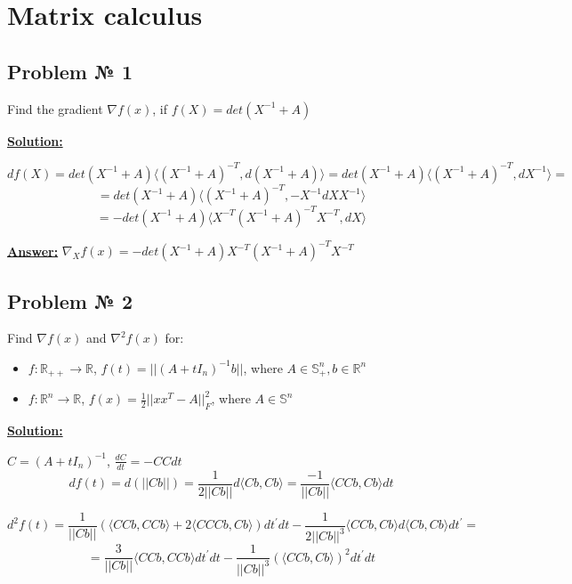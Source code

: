 \section{Matrix calculus}

\subsection{Problem № 1} Find the gradient $\nabla f(x)$, if $f(X) = det \left( X^{-1} + A \right)$

\underline{\textbf{Solution:}}

\begin{equation*}
    df(X) = det \left(X^{-1} + A \right) \langle (X^{-1} + A)^{-T}, d(X^{-1} + A) \rangle = det \left(X^{-1} + A \right) \langle (X^{-1} + A)^{-T}, dX^{-1} \rangle =
\end{equation*}
\begin{equation*}
    = det \left(X^{-1} + A \right) \langle (X^{-1} + A)^{-T}, -X^{-1}dX X^{-1} \rangle 
\end{equation*}
\begin{equation*}
    = -det \left(X^{-1} + A \right) \langle X^{-T}(X^{-1} + A)^{-T}X^{-T}, dX \rangle
\end{equation*}

\underline{\textbf{Answer:}} $\nabla_X f(x) = -det \left(X^{-1} + A \right) X^{-T}(X^{-1} + A)^{-T}X^{-T}$

\subsection{Problem № 2} 
Find $\nabla f(x)$ and $\nabla^2 f(x)$ for:
\begin{itemize}
    \item $f: \mathbb{R}_{++} \xrightarrow{} \mathbb{R}$, $f(t) = ||(A+tI_n)^{-1}b||$, where $A \in \mathbb{S}_{+}^n, b \in \mathbb{R}^n$
    \item $f: \mathbb{R}^{n} \xrightarrow{} \mathbb{R}$, $f(x) = \frac{1}{2}||xx^T-A||_F^2$, where $A \in \mathbb{S}^n$
\end{itemize}
\underline{\textbf{Solution:}}

$C = (A+tI_n)^{-1}$, $\frac{dC}{dt} = -CCdt$
\begin{equation*}
    df(t) = d(||Cb||) = \frac{1}{2||Cb||} d\langle Cb, Cb \rangle = \frac{-1}{||Cb||} \langle CCb, Cb \rangle dt
\end{equation*}

\begin{equation*}
    d^2f(t) = \frac{1}{||Cb||}\left(\langle CCb, CCb\rangle + 2\langle CCCb, Cb\rangle\right)dt^'dt - \frac{1}{2||Cb||^{3}} \langle CCb, Cb \rangle d \langle Cb, Cb \rangle dt^' = 
\end{equation*}
\begin{equation*}
     = \frac{3}{||Cb||}\langle CCb, CCb\rangle dt^'dt - \frac{1}{||Cb||^{3}} (\langle CCb, Cb \rangle)^2dt^'dt
\end{equation*}

